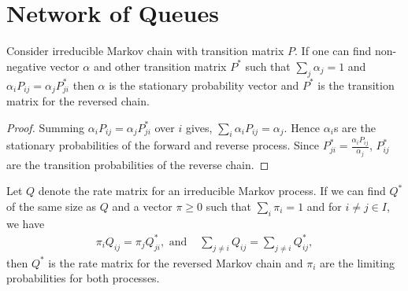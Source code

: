 \documentclass[a4paper,10pt,english]{article}
\begin{document}
\section{Network of Queues}
\begin{thm}
Consider irreducible Markov chain with transition matrix $P$. If one can find non-negative vector $\alpha$ and other transition matrix $P^*$ such that $\sum_j \alpha_j =1$ and $\alpha_iP_{ij}=\alpha_jP^*_{ji}$ then $\alpha$ is the stationary probability vector and $P^*$ is the transition matrix for the reversed chain.
\end{thm}
\begin{proof}
Summing $\alpha_iP_{ij}=\alpha_jP_{ji}^*$ over $i$ gives, $\sum_{i}\alpha_iP_{ij}=\alpha_j$. Hence $\alpha_i$s are the stationary probabilities of the forward and reverse process. Since $P_{ji}^*=\frac{\alpha_iP_{ij}}{\alpha_j}$, $P_{ij}^*$ are the transition probabilities of the reverse chain.
\end{proof} 

\begin{thm}
Let $Q$ denote the rate matrix for an irreducible Markov process. If we can find $Q^*$ of the same size as $Q$ and a vector $\pi \geq 0$ such that $\sum_i \pi_i =1$ and for $i \neq j \in I$, we have
\begin{align*}
\pi_{i}Q_{ij} =\pi_jQ_{ji}^*, \text{ and } &
\sum_{j \neq i}Q_{ij} =\sum_{j \neq i}Q_{ij}^*,
\end{align*} 
then $Q^*$ is the rate matrix for the reversed Markov chain and $\pi_i$ are the limiting probabilities for both  processes.
\end{thm}
\end{document}
